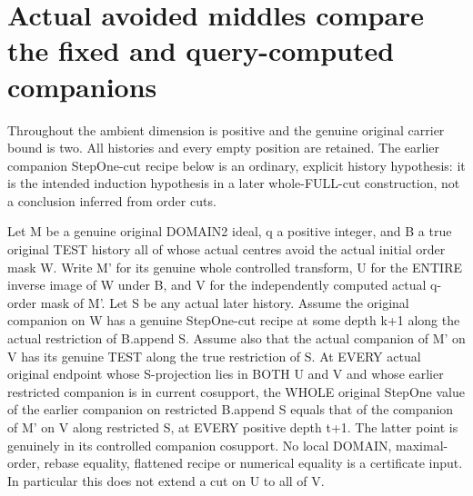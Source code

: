 \section{Actual avoided middles compare the fixed and query-computed companions}

Throughout the ambient dimension is positive and the genuine original
carrier bound is two. All histories and every empty position are retained.
The earlier companion StepOne-cut recipe below is an ordinary, explicit
history hypothesis: it is the intended induction hypothesis in a later
whole-FULL-cut construction, not a conclusion inferred from order cuts.

\begin{theorem}
\label{hir:original-avoided-middle-two-mask-stepone-comparison}
\leanok
Let M be a genuine original DOMAIN2 ideal, q a positive integer, and B a
true original TEST history all of whose actual centres avoid the actual
initial order mask W. Write M' for its genuine whole controlled transform,
U for the ENTIRE inverse image of W under B, and V for the independently
computed actual q-order mask of M'. Let S be any actual later history.
Assume the original companion on W has a genuine StepOne-cut recipe at
some depth k+1 along the actual restriction of B.append S. Assume also
that the actual companion of M' on V has its genuine TEST along the true
restriction of S. At EVERY actual original endpoint whose S-projection
lies in BOTH U and V and whose earlier restricted companion is in current
cosupport, the WHOLE original StepOne value of the earlier companion on
restricted B.append S equals that of the companion of M' on V along
restricted S, at EVERY positive depth t+1. The latter point is genuinely
in its controlled companion cosupport. No local DOMAIN, maximal-order,
rebase equality, flattened recipe or numerical equality is a certificate
input. In particular this does not extend a cut on U to all of V.
\end{theorem}
